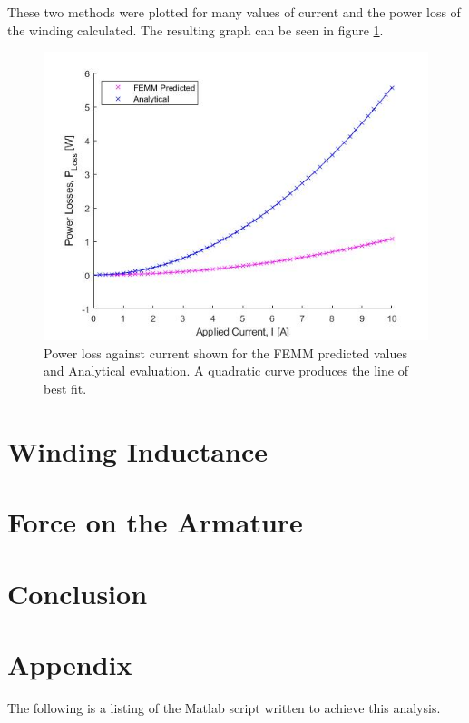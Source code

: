 \documentclass[a4paper]{IEEEtran}
\begin{document}
These two methods were plotted for many values of current and the power loss of the winding calculated. The resulting graph can be seen in figure \ref{windingLoss}.

\begin{figure}[ht]
\includegraphics[width = \linewidth]{ResistanceWindingLoss.jpg}
\caption{Power loss against current shown for the FEMM predicted values and Analytical evaluation. A quadratic curve produces the line of best fit.}
\label{windingLoss} 
\end{figure}

\section{Winding Inductance}

\section{Force on the Armature}

\section{Conclusion}

\pagebreak
\onecolumn
\section{Appendix}
The following is a listing of the Matlab script written to achieve this analysis.

\end{document}
